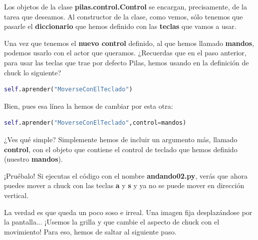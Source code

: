 \documentclass{article}
\begin{document}
Los objetos de la clase \textbf{pilas.control.Control} se encargan, precisamente, de la tarea que deseamos. Al constructor de la clase, como vemos, sólo tenemos que pasarle el \textbf{diccionario} que hemos definido con las \textbf{teclas} que vamos a usar.\par
Una vez que tenemos el \textbf{nuevo control} definido, al que hemos llamado \textbf{mandos}, podemos usarlo con el actor que queramos. ¿Recuerdas que en el paso anterior, para usar las teclas que trae por defecto Pilas, hemos usando en la definición de chuck lo siguiente?
\begin{lstlisting}[language=Python]
self.aprender("MoverseConElTeclado")
\end{lstlisting}
\vspace{\baselineskip}

Bien, pues esa línea la hemos de cambiar por esta otra:
\begin{lstlisting}[language=Python]
self.aprender("MoverseConElTeclado",control=mandos)
\end{lstlisting}

\vspace{\baselineskip}
¿Ves qué simple? Simplemente hemos de incluir un argumento más, llamado \textbf{control}, con  el objeto que contiene el control de teclado que hemos definido (nuestro \textbf{mandos}).\par
¡Pruébalo! Si ejecutas el código con el nombre \textbf{andando02.py}, verás que ahora puedes mover a chuck con las teclas \textbf{a} y \textbf{s} y ya no se puede mover en dirección vertical.\par
La verdad es que queda un poco soso e irreal. Una imagen fija desplazándose por la 
pantalla... ¡Usemos la grilla y que cambie el aspecto de chuck con el movimiento!
Para eso, hemos de saltar al siguiente paso.\par
\end{document}
